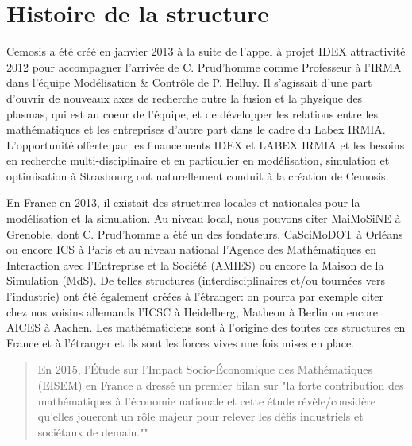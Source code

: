 \section*{Histoire de la structure}
	
Cemosis a été créé en janvier 2013 à la suite de l'appel à projet IDEX attractivité 2012 pour accompagner l'arrivée de C. Prud'homme comme Professeur à l'IRMA dans l'équipe Modélisation \& Contrôle de P. Helluy. Il s'agissait d'une part d'ouvrir de nouveaux axes de recherche outre la fusion et la physique des plasmas, qui est au coeur de l'équipe, et de développer les relations entre les mathématiques et les entreprises d'autre part dans le cadre du Labex IRMIA. L'opportunité offerte par les financements IDEX et LABEX IRMIA et les besoins en recherche multi-disciplinaire et en particulier en modélisation, simulation et optimisation  à Strasbourg ont naturellement conduit à la création de Cemosis.

En France en 2013, il existait des structures locales et nationales pour la modélisation et la simulation. Au niveau local, nous pouvons citer MaiMoSiNE à Grenoble, dont C. Prud'homme a été un des fondateurs, CaSciMoDOT à Orléans ou encore ICS à Paris et au niveau national l'Agence des Mathématiques en Interaction avec l'Entreprise et la Société (AMIES) ou encore la Maison de la Simulation  (MdS). De telles structures (interdisciplinaires et/ou tournées vers l'industrie) ont été également créées à l'étranger: on pourra par exemple citer chez nos voisins allemands l'ICSC à Heidelberg, Matheon à Berlin ou encore AICES à Aachen.
Les mathématiciens sont à l'origine des toutes ces structures en France et à l'étranger et ils sont les forces vives une fois mises en place. 
 
\begin{quote}
En 2015, l'Étude sur l'Impact Socio-Économique des Mathématiques (EISEM) en France a dressé un premier bilan sur "la  forte contribution des mathématiques à l'économie nationale et cette étude révèle/considère qu'elles joueront un rôle majeur pour relever les défis industriels et sociétaux de demain.""
\end{quote}

